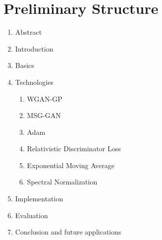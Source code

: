 \documentclass[]{article}
\begin{document}
\newpage

\section{Preliminary Structure}

\noindent
\begin{enumerate}
  \item Abstract
  \item Introduction
  \item Basics \cite{goodfellow2014generative}
  \item Technologies
  \begin{enumerate}
    \item WGAN-GP \cite{arjovsky2017wasserstein,gulrajani2017improved}
    \item MSG-GAN \cite{karnewar2020msggan}
    \item Adam \cite{kingma2017adam}
    \item Relativistic Discriminator Loss \cite{jolicoeurmartineau2018relativistic}
    \item Exponential Moving Average \cite{yazıcı2019unusual}
    \item Spectral Normalization \cite{miyato2018spectral}
  \end{enumerate}
  \item Implementation
  \item Evaluation
  \item Conclusion and future applications
\end{enumerate}

\printbibliography
\end{document}
